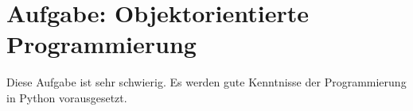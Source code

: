 \section{Aufgabe: Objektorientierte Programmierung}

Diese Aufgabe ist sehr schwierig. Es werden gute Kenntnisse der Programmierung in Python vorausgesetzt.